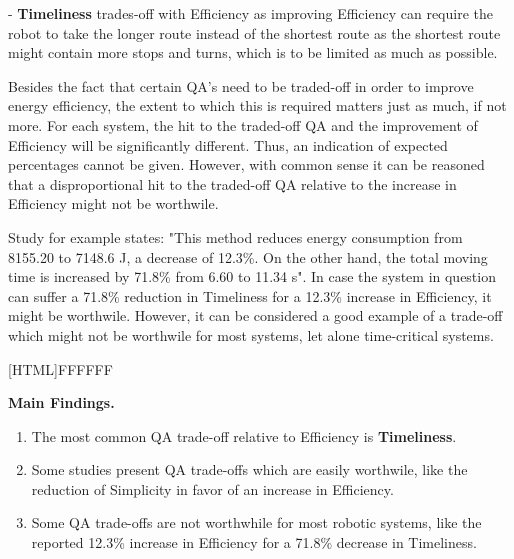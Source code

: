 - \textbf{Timeliness} trades-off with Efficiency as improving Efficiency can require the robot to take the longer route instead of the shortest route
as the shortest route might contain more stops and turns, which is to be limited as much as possible.

\vspace{5mm}

Besides the fact that certain QA's need to be traded-off in order to improve energy efficiency, the extent to which this is required 
matters just as much, if not more.
For each system, the hit to the traded-off QA and the improvement of Efficiency will be significantly different.
Thus, an indication of expected percentages cannot be given.
However, with common sense it can be reasoned that a disproportional hit to the traded-off QA relative to the increase in Efficiency might not be worthwile.

Study \cite{kaitwanidvilai2020industrial_robot_cycle_time} for example states: "This method reduces energy consumption from 8155.20 to 7148.6 J, 
a decrease of 12.3\%.  On the other hand, the total moving time is increased by 71.8\% from 6.60 to 11.34 s". 
In case the system in question can suffer a 71.8\% reduction in Timeliness for a 12.3\% increase in Efficiency, it might be worthwile.
However, it can be considered a good example of a trade-off which might not be worthwile for most systems, let alone time-critical systems.

\vspace{5mm}

\noindent{}[HTML]{FFFFFF}{\parbox{0.47\textwidth}{%
\noindent \textbf{Main Findings.}
\begin{enumerate}[nolistsep]
\item The most common QA trade-off relative to Efficiency is \textbf{Timeliness}.
\item Some studies present QA trade-offs which are easily worthwile, like the reduction of Simplicity in favor of an increase in Efficiency.
\item Some QA trade-offs are not worthwhile for most robotic systems, like the reported 12.3\% increase in Efficiency for a 71.8\% decrease in Timeliness.
\end{enumerate}}}
